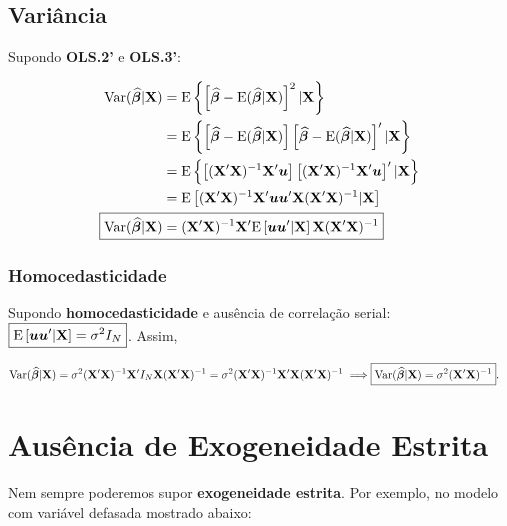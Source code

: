 \documentclass[11pt, oneside, a4paper, article]{article}
\numberwithin{equation}{section}
\begin{document}
\subsection{Variância} 
Supondo \textbf{OLS.2'} e \textbf{OLS.3'}:

\vspace{-1 em}
\begin{align*} 
\Var ( \widehat{\mbs{\beta}} | \Xmat) 
&= \E \left\{\left[ 
\widehat{\mbs{\beta}} - \E ( \widehat{\mbs{\beta}} | \Xmat )
\right]^2 | \Xmat \right\}
\\
&= \E \left\{ 
\left[ \widehat{\mbs{\beta}} - \E ( \widehat{\mbs{\beta}} | \Xmat ) \right]
\left[ \widehat{\mbs{\beta}} - \E ( \widehat{\mbs{\beta}} | \Xmat ) \right]'
| \Xmat \right\}
\\
&= \E \left\{ 
\left[ (\Xmat'\Xmat)^{-1}\Xmat' \mbs{u} \right]
\left[ (\Xmat'\Xmat)^{-1}\Xmat' \mbs{u} \right]'
| \Xmat \right\}
\\
&= \E \left[ (\Xmat'\Xmat)^{-1}\Xmat' \mbs{u} \mbs{u}' \Xmat (\Xmat'\Xmat)^{-1} | \Xmat \right]
\\
\Aboxed{
\Var ( \widehat{\mbs{\beta}} | \Xmat) 
&= 
(\Xmat'\Xmat)^{-1}\Xmat' 
\E \left[ \mbs{u} \mbs{u}'| \Xmat \right]
\Xmat (\Xmat'\Xmat)^{-1} }
\end{align*}

\subsubsection{Homocedasticidade}
Supondo \textbf{homocedasticidade} e ausência de correlação serial: 
$\boxed{ \text{E} \left[ \boldsymbol{u} \boldsymbol{u}'| \mathbf{X} \right] = \sigma^2 I_{N} }$.
Assim, 

\vspace{-1 em}
\begin{align*} 
\Var ( \widehat{\mbs{\beta}} | \Xmat) 
= \sigma^2 (\Xmat'\Xmat)^{-1}\Xmat' I_{N} \Xmat (\Xmat'\Xmat)^{-1}
= \sigma^2 (\Xmat'\Xmat)^{-1}\Xmat'\Xmat (\Xmat'\Xmat)^{-1}
\implies
\Aboxed{ \Var ( \widehat{\mbs{\beta}} | \Xmat) &= \sigma^2 (\Xmat'\Xmat)^{-1} }.
\end{align*}

\clearpage
\section{Ausência de Exogeneidade Estrita}
Nem sempre poderemos supor \textbf{exogeneidade estrita}.
Por exemplo, no modelo com variável defasada mostrado abaixo:
\end{document}
